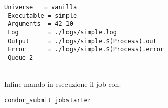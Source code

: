 \begin{lstlisting}[style=cmd]
 Universe   = vanilla
 Executable = simple
 Arguments  = 42 10
 Log        = ./logs/simple.log
 Output     = ./logs/simple.$(Process).out
 Error      = ./logs/simple.$(Process).error
 Queue 2
\end{lstlisting}
\ \\
Infine mando in esecuzione il job con: 

\begin{lstlisting}[style=cmd]
 condor_submit jobstarter
\end{lstlisting}